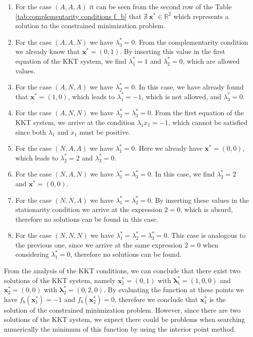 \documentclass[a4paper,11pt]{article}
\begin{document}
\begin{enumerate}
	\item For the case $(A, A, A)$ it can be seen from the second row of the Table \ref{tab:complementarity conditions f_b} that $\nexists \ \textbf{x}^* \in \mathbb{R}^{2}$ which represents a solution to the constrained minimization problem.
	\item For the case $(A, A, N)$ we have $\lambda_{3}^*=0$. From the complementarity condition we already know that $\textbf{x}^*=(0,1)$. By inserting this value in the first equation of the KKT system, we find $\lambda_{1}^*=1$ and $\lambda_{2}^*=0$, which are allowed values.
	\item For the case $(A, N, A)$ we have $\lambda_{2}^*=0$. In this case, we have already found that $\textbf{x}^*=(1,0)$, which leads to $\lambda_{1}^*=-1$, which is not allowed, and $\lambda_{3}^*=0$.
	\item For the case $(A, N, N)$ we have $\lambda_{2}^*=\lambda_{3}^*=0$. From the first equation of the KKT system, we arrive at the condition $\lambda_{1}x_{1}=-1$, which cannot be satisfied since both $\lambda_{1}$ and $x_{1}$ must be positive.
	\item For the case $(N, A, A)$ we have $\lambda_{1}^*=0$. Here we already have $\textbf{x}^*=(0,0)$, which leads to $\lambda_{2}^*=2$ and $\lambda_{3}^*=0$.
	\item For the case $(N, A, N)$ we have $\lambda_{1}^*=\lambda_{3}^*=0$. In this case, we find $\lambda_{2}^*=2$ and $\textbf{x}^*=(0,0)$.
	\item For the case $(N, N, A)$ we have $\lambda_{1}^*=\lambda_{2}^*=0$. By inserting these values in the stationarity condition we arrive at the expression $2=0$, which is absurd, therefore no solutions can be found in this case.
	\item For the case $(N, N, N)$ we have $\lambda_{1}^*=\lambda_{2}^*=\lambda_{3}^*=0$. This case is analogous to the previous one, since we arrive at the same expression $2=0$ when considering $\lambda_{1}^*=0$, therefore no solutions can be found.
\end{enumerate}
From the analysis of the KKT conditions, we can conclude that there exist two solutions of the KKT system, namely $\textbf{x}_{1}^*=(0,1)$ with $\boldsymbol{\lambda}_{1}^*=(1,0,0)$ and $\textbf{x}_{2}^*=(0,0)$ with $\boldsymbol{\lambda}_{2}^*=(0,2,0)$. By evaluating the function at these points we have $f_{b}(\textbf{x}_{1}^*)=-1$ and  $f_{b}(\textbf{x}_{2}^*)=0$, therefore we conclude that $\textbf{x}_{1}^*$ is the solution of the constrained minimization problem. However, since there are two solutions of the KKT system, we expect there could be problems when searching numerically the minimum of this function by using the interior point method.
\end{document}
